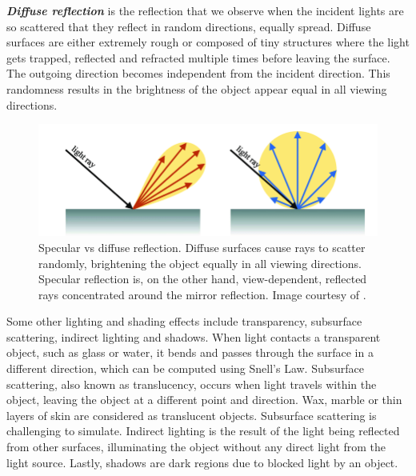 

\textbf{\textit{Diffuse reflection}} is the reflection that we observe when the incident lights are so scattered that they reflect in random directions, equally spread. Diffuse surfaces are either extremely rough or composed of tiny structures where the light gets trapped, reflected and refracted multiple times before leaving the surface. The outgoing direction becomes independent from the incident direction. This randomness results in the brightness of the object appear equal in all viewing directions. 



\begin{figure}[h]
  \centering
   \includegraphics[width=0.5\linewidth]{Images/Differences-between-the-specular-and-diffuse-reflections-specuclar-reflections-occur-on.png}
   \caption{Specular vs diffuse reflection. Diffuse surfaces cause rays to scatter randomly, brightening the object equally in all viewing directions. Specular reflection is, on the other hand, view-dependent, reflected rays concentrated around the mirror reflection. Image courtesy of \citeauthor{specfig}.}
   \label{fig:specularvsdiffuse}
\end{figure}

Some other lighting and shading effects include transparency, subsurface scattering, indirect lighting and shadows. When light contacts a transparent object, such as glass or water, it bends and passes through the surface in a different direction, which can be computed using Snell's Law. Subsurface scattering, also known as translucency, occurs when light travels within the object, leaving the object at a different point and direction. Wax, marble or thin layers of skin are considered as translucent objects. Subsurface scattering is challenging to simulate. Indirect lighting is the result of the light being reflected from other surfaces, illuminating the object without any direct light from the light source. Lastly, shadows are dark regions due to blocked light by an object. 

